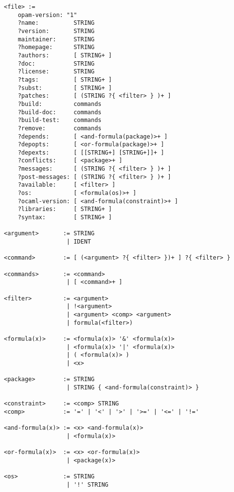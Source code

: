\documentclass[a4paper,10pt]{article}
\begin{document}
{\small
\begin{Verbatim}[frame=single]
<file> :=
    opam-version: "1"
    ?name:          STRING
    ?version:       STRING
    maintainer:     STRING
    ?homepage:      STRING
    ?authors:       [ STRING+ ]
    ?doc:           STRING
    ?license:       STRING
    ?tags:          [ STRING+ ]
    ?subst:         [ STRING+ ]
    ?patches:       [ (STRING ?{ <filter> } )+ ]
    ?build:         commands
    ?build-doc:     commands
    ?build-test:    commands
    ?remove:        commands
    ?depends:       [ <and-formula(package)>+ ]
    ?depopts:       [ <or-formula(package)>+ ]
    ?depexts:       [ [[STRING+] [STRING+]]+ ]
    ?conflicts:     [ <package>+ ]
    ?messages:      [ (STRING ?{ <filter> } )+ ]
    ?post-messages: [ (STRING ?{ <filter> } )+ ]
    ?available:     [ <filter> ]
    ?os:            [ <formula(os)>+ ]
    ?ocaml-version: [ <and-formula(constraint)>+ ]
    ?libraries:     [ STRING+ ]
    ?syntax:        [ STRING+ ]

<argument>       := STRING
                  | IDENT

<command>        := [ (<argument> ?{ <filter> })+ ] ?{ <filter> }

<commands>       := <command>
                  | [ <command>+ ]

<filter>         := <argument>
                  | !<argument>
                  | <argument> <comp> <argument>
                  | formula(<filter>)

<formula(x)>     := <formula(x)> '&' <formula(x)>
                  | <formula(x)> '|' <formula(x)>
                  | ( <formula(x)> )
                  | <x>

<package>        := STRING
                  | STRING { <and-formula(constraint)> }

<constraint>     := <comp> STRING
<comp>           := '=' | '<' | '>' | '>=' | '<=' | '!='

<and-formula(x)> := <x> <and-formula(x)>
                  | <formula(x)>

<or-formula(x)>  := <x> <or-formula(x)>
                  | <package(x)>

<os>             := STRING
                  | '!' STRING
\end{Verbatim}
}
\end{document}
